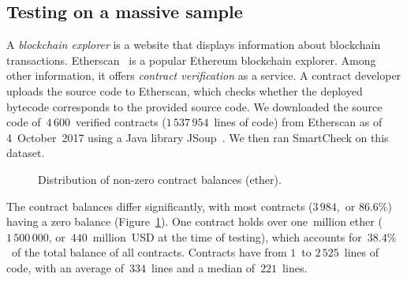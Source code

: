 \subsection{Testing on a massive sample} \label{MassiveTesting}

A \textit{blockchain explorer} is a website that displays information about blockchain transactions.
Etherscan~\cite{EtherscanVerified} is a popular Ethereum blockchain explorer.
Among other information, it offers \textit{contract verification} as a service.
A contract developer uploads the source code to Etherscan, which checks whether the deployed bytecode corresponds to the provided source code.
We downloaded the source code of~$4\,600$~verified contracts ($1\,537\,954$~lines of code) from Etherscan as of 4~October~2017 using a Java library JSoup~\cite{JSoup}.
We then ran SmartCheck on this dataset.

\begin{figure}
	\centering
	\caption{Distribution of non-zero contract balances (ether).}
	\label{BalancesFigure}
\end{figure}

The contract balances differ significantly, with most contracts ($3\,984$,~or $86.6\%$) having a zero balance (Figure~\ref{BalancesFigure}).
One contract holds over one~million ether ($1\,500\,000$, or~$440$~million~USD at the time of testing), which accounts for~$38.4\%$~of the total balance of all contracts.
Contracts have from $1$~to $2\,525$~lines of code, with an average of~$334$~lines and a median of~$221$~lines.

